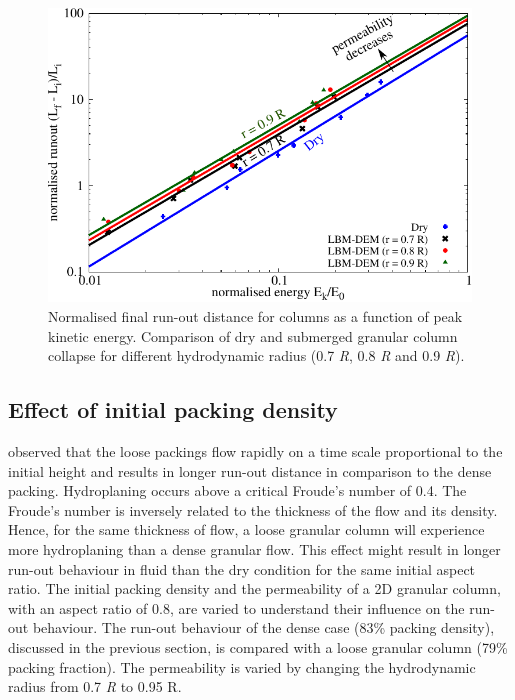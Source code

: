 \begin{landscape}
\begin{figure}
	\centering
	\includegraphics[height=0.9\textheight]{runout_fluid_dry_energy}
	\caption[Normalised final run-out distance for columns as a function of 
		peak kinetic energy in dry and submerged conditions.]{Normalised final 
		run-out distance for columns as a function of 
	peak kinetic energy. Comparison of dry and submerged granular column 
	collapse for different hydrodynamic radius (0.7 \textit{R}, 0.8 \textit{R} 
	and 0.9 \textit{R}).}
	\label{fig:runout_fluid_dry_energy}
\end{figure}
\end{landscape}



\subsection{Effect of initial packing density}

\citet{Rondon2011} observed that the loose packings flow rapidly on a time
scale proportional to the initial height and results in longer run-out distance 
in comparison to the dense packing. Hydroplaning occurs above a critical 
Froude's number of 0.4. The Froude's number is inversely related to the 
thickness of the flow and its density. Hence, for the same thickness of flow, a 
loose granular column will experience more hydroplaning than a dense granular 
flow. This effect might result in longer run-out behaviour in fluid than the 
dry condition for the same initial aspect ratio. The initial packing density 
and the permeability of a 2D granular column, with an aspect ratio of 0.8, are 
varied to understand their influence on the run-out behaviour. The run-out 
behaviour of the dense case (83\% packing density), discussed in the previous 
section, is compared with a loose granular column (79\% packing fraction). The 
permeability is varied by changing the hydrodynamic radius from 0.7 \textit{R} 
to 0.95 
R. 

